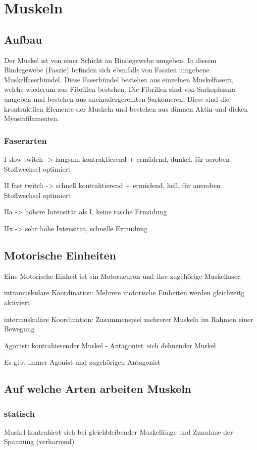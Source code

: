 \documentclass{article}
\begin{document}
\section*{Muskeln}
\subsection*{Aufbau}
Der Muskel ist von einer Schicht an Bindegewebe umgeben. In diesem Bindegewebe (Faszie) befinden 
sich ebenfalls von Faszien umgebene Muskelfaserbündel. Diese Faserbündel bestehen aus einzelnen Muskelfasern,
welche wiederum aus Fibrillen bestehen. Die Fibrillen sind von Sarkoplasma umgeben und bestehen aus aneinadergereihten 
Sarkomeren. Diese sind die krontraktilen Elemente der Muskeln und bestehen aus dünnen Aktin und dicken Myosinfilamenten.

\subsubsection*{Faserarten}
I slow twitch -> langsam kontraktierend + ermüdend, dunkel, für aeroben Stoffwechsel optimiert

II fast twitch ->  schnell kontraktierend + ermüdend, hell, für aneroben Stoffwechsel optimiert

IIa -> höhere Intensität als I, keine rasche Ermüdung

IIx -> sehr hohe Intensität, schnelle Ermüdung

\subsection*{Motorische Einheiten}
Eine Motorische Einheit ist ein Motorneuron und ihre zugehörige Muskelfaser.

intramuskuläre Koordination: Mehrere motorische Einheiten werden gleichzeitg aktiviert

intermuskuläre Koordination: Zusammenspiel mehrerer Muskeln im Rahmen einer Bewegung

Agonist: kontrahierender Muskel - Antagonist: sich dehnender Muskel

Es gibt immer Agonist und zugehörigen Antagonist

\subsection*{Auf welche Arten arbeiten Muskeln}
\subsubsection*{statisch}
Muskel kontrahiert sich bei gleichbleibender Muskellänge und Zunahme der Spannung (verharrend)
\end{document}
